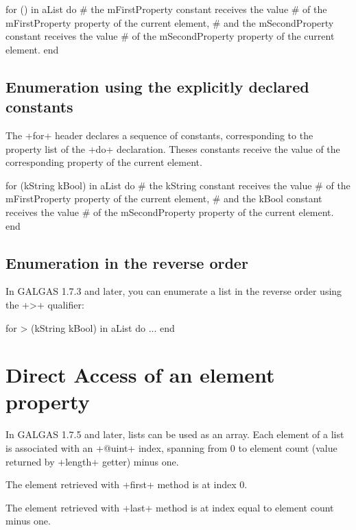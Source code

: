 \begin{galgas}
for () in aList do
  # the mFirstProperty constant receives the value
  # of the mFirstProperty property of the current element,
  # and the mSecondProperty constant receives the value
  # of the mSecondProperty property of the current element.
end
\end{galgas}

\subsection{Enumeration using the explicitly declared constants}

The \ggs+for+ header declares a sequence of constants, corresponding to the property list of the \ggs+do+ declaration. Theses constants receive the value of the corresponding property of the current element.


\begin{galgas}
for (kString kBool) in aList do
  # the kString constant receives the value
  # of the mFirstProperty property of the current element,
  # and the kBool constant receives the value
  # of the mSecondProperty property of the current element.
end
\end{galgas}

\subsection{Enumeration in the reverse order}

In GALGAS 1.7.3 and later, you can enumerate a list in the reverse order using the \ggs+>+ qualifier:

\begin{galgas}
for > (kString kBool) in aList do
  ...
end
\end{galgas}




\section{Direct Access of an element property}

In GALGAS 1.7.5 and later, lists can be used as an array. Each element of a list is associated with an \ggs+@uint+ index, spanning from 0 to element count (value returned by \ggs+length+ getter) minus one.

The element retrieved with \ggs+first+ method is at index 0.

The element retrieved with \ggs+last+ method is at index equal to element count minus one.

